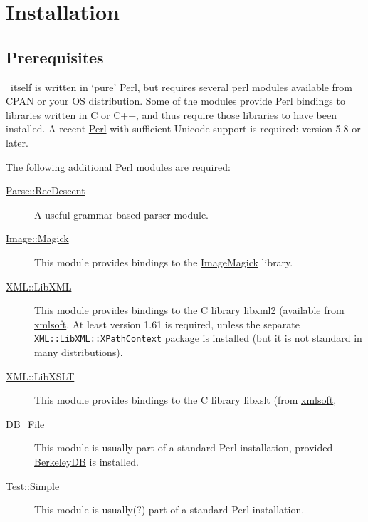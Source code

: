 \documentclass{article}
\begin{document}
\section{Installation}\label{install}

\subsection{Prerequisites}
\LaTeXML\ itself is written in `pure' Perl, but requires several
perl modules available from CPAN or your OS distribution.
Some of the modules provide Perl bindings to libraries
written in C or C++, and thus require those libraries to have been installed.
A recent \href{http://www.perl.org/}{Perl}
with sufficient Unicode support is required: version 5.8 or later.

The following additional Perl modules are required:
\begin{description}
\item[\href{http://search.cpan.org/search?query=Parse::RecDescent&mode=module}{Parse::RecDescent}]
    A useful grammar based parser module.
\item[\href{http://search.cpan.org/search?query=Image::Magick&mode=module}{Image::Magick}]
    This module provides bindings to the \href{http://www.imagemagick.org/}{ImageMagick} library.
\item[\href{http://search.cpan.org/search?query=XML::LibXML&mode=module}{XML::LibXML}]
    This module provides bindings to the C library libxml2
    (available from \href{http://www.xmlsoft.org}{xmlsoft}.
    At least version 1.61 is required, unless the separate \texttt{XML::LibXML::XPathContext}
    package is installed (but it is not standard in many distributions).
\item[\href{http://search.cpan.org/search?query=XML::LibXSLT&mode=module}{XML::LibXSLT}]
    This module provides bindings to the C library libxslt
    (from \href{http://www.xmlsoft.org}{xmlsoft},
\item[\href{http://search.cpan.org/search?query=DB_File&mode=module}{DB\_File}]
    This module is usually part of a standard Perl installation, provided
    \href{http://www.sleepycat.com}{BerkeleyDB} is installed.
\item[\href{http://search.cpan.org/search?query=Test::Simple&mode=module}{Test::Simple}]
    This module is usually(?) part of a standard Perl installation.
\end{description}
\end{document}
